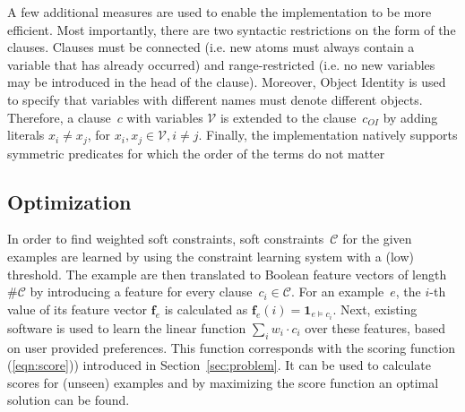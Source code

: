 \documentclass[letterpaper]{article}
\newcommand{\sym}[1]{\ensuremath{\mathcal{#1}}}
\theoremstyle{definition}
\begin{document}
A few additional measures are used to enable the implementation to be more efficient.
Most importantly, there are two syntactic restrictions on the form of the clauses.
Clauses must be connected (i.e. new atoms must always contain a variable that has already occurred) and range-restricted (i.e. no new variables may be introduced in the head of the clause).
Moreover, Object Identity is used to specify that variables with different names must denote different objects.
Therefore, a clause~$c$ with variables \sym{V} is extended to the clause~$c_{OI}$ by adding literals $x_i \neq x_j$, for $x_i, x_j \in \sym{V}, i \neq j$.
Finally, the implementation natively supports symmetric predicates for which the order of the terms do not matter

\subsection{Optimization}
In order to find weighted soft constraints, soft constraints~\sym{C} for the given examples are learned by using the constraint learning system with a (low) threshold.
The example are then translated to Boolean feature vectors of length $\# \sym{C}$ by introducing a feature for every clause~$c_i \in \sym{C}$.
For an example~$e$, the $i$-th value of its feature vector $\mathbf{f}_e$ is calculated as $\mathbf{f}_e(i) = \mathbf{1}_{e \models c_i}$.
Next, existing software is used to learn the linear function $\sum_i w_i \cdot c_i$ over these features, based on user provided preferences.
This function corresponds with the scoring function (\ref{eqn:score})) introduced in Section~\ref{sec:problem}.
It can be used to calculate scores for (unseen) examples and by maximizing the score function an optimal solution can be found.
\end{document}
